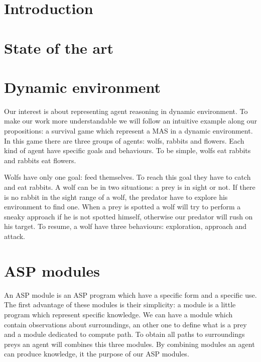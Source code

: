 \documentclass{aamas2012}
\begin{document}



\section{Introduction}

\section{State of the art}

\section{Dynamic environment}

	Our interest is about representing agent reasoning in dynamic environment.
	To make our work more understandable we will follow an intuitive example along our propositions: a survival game which represent a MAS in a dynamic environment.
	In this game there are three groups of agents: wolfs, rabbits and flowers.
	Each kind of agent have specific goals and behaviours.
	To be simple, wolfs eat rabbits and rabbits eat flowers.
	
	Wolfs have only one goal: feed themselves.
	To reach this goal they have to catch and eat rabbits.
	A wolf can be in two situations: a prey is in sight or not.
	If there is no rabbit in the sight range of a wolf, the predator have to explore his environment to find one.
	When a prey is spotted a wolf will try to perform a sneaky approach if he is not spotted himself, otherwise our predator will rush on his target.
	To resume, a wolf have three behaviours: exploration, approach and attack.

\section{ASP modules}

	An ASP module is an ASP program which have a specific form and a specific use.
	The first advantage of these modules is their simplicity: a module is a little program which represent specific knowledge.
	We can have a module which contain observations about surroundings,
	an other one to define what is a prey and a module dedicated to compute path.
	To obtain all paths to surroundings preys an agent will combines this three modules.
	By combining modules an agent can produce knowledge, it the purpose of our ASP modules.
\end{document}

